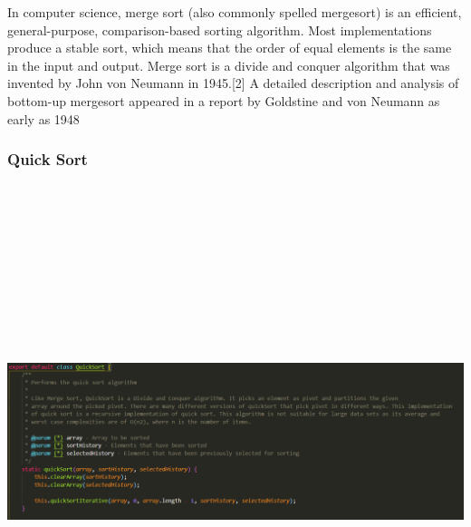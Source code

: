 In computer science, merge sort (also commonly spelled mergesort) is an efficient, general-purpose, comparison-based sorting algorithm. Most implementations produce a stable sort, which means that the order of equal elements is the same in the input and output. Merge sort is a divide and conquer algorithm that was invented by John von Neumann in 1945.[2] A detailed description and analysis of bottom-up mergesort appeared in a report by Goldstine and von Neumann as early as 1948

\subsubsection{Quick Sort}
\begin{center}
    \includegraphics[width=15cm,height=15cm,keepaspectratio]{images/quicksort1}

\end{center}
